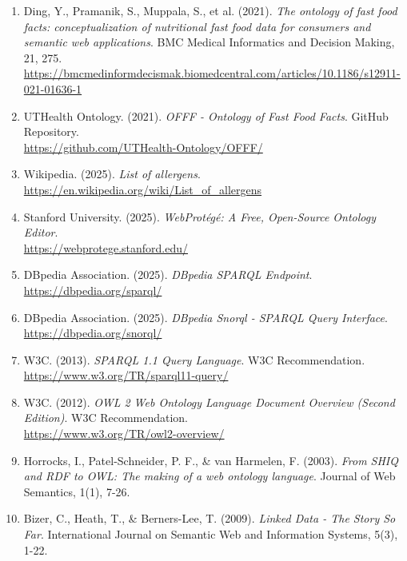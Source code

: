 \documentclass[12pt,a4paper]{article}
\begin{document}
\begin{enumerate}
    \item Ding, Y., Pramanik, S., Muppala, S., et al. (2021). \textit{The ontology of fast food facts: conceptualization of nutritional fast food data for consumers and semantic web applications}. BMC Medical Informatics and Decision Making, 21, 275. \\
    \url{https://bmcmedinformdecismak.biomedcentral.com/articles/10.1186/s12911-021-01636-1}
    
    \item UTHealth Ontology. (2021). \textit{OFFF - Ontology of Fast Food Facts}. GitHub Repository. \\
    \url{https://github.com/UTHealth-Ontology/OFFF/}
    
    \item Wikipedia. (2025). \textit{List of allergens}. \\
    \url{https://en.wikipedia.org/wiki/List_of_allergens}
    
    \item Stanford University. (2025). \textit{WebProtégé: A Free, Open-Source Ontology Editor}. \\
    \url{https://webprotege.stanford.edu/}
    
    \item DBpedia Association. (2025). \textit{DBpedia SPARQL Endpoint}. \\
    \url{https://dbpedia.org/sparql/}
    
    \item DBpedia Association. (2025). \textit{DBpedia Snorql - SPARQL Query Interface}. \\
    \url{https://dbpedia.org/snorql/}
    
    \item W3C. (2013). \textit{SPARQL 1.1 Query Language}. W3C Recommendation. \\
    \url{https://www.w3.org/TR/sparql11-query/}
    
    \item W3C. (2012). \textit{OWL 2 Web Ontology Language Document Overview (Second Edition)}. W3C Recommendation. \\
    \url{https://www.w3.org/TR/owl2-overview/}
    
    \item Horrocks, I., Patel-Schneider, P. F., \& van Harmelen, F. (2003). \textit{From SHIQ and RDF to OWL: The making of a web ontology language}. Journal of Web Semantics, 1(1), 7-26.
    
    \item Bizer, C., Heath, T., \& Berners-Lee, T. (2009). \textit{Linked Data - The Story So Far}. International Journal on Semantic Web and Information Systems, 5(3), 1-22.
\end{enumerate}
\end{document}
